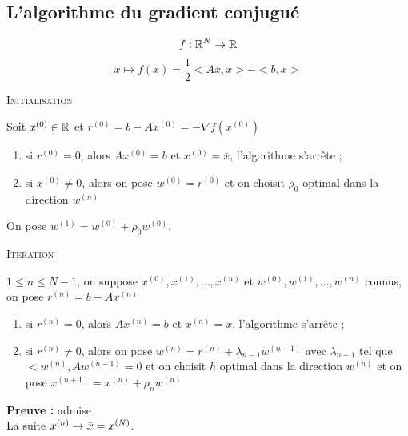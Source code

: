 \subsection{L'algorithme du gradient conjugué}

\[f:\mathbb{R}^N\rightarrow \mathbb{R} \]
\[x \mapsto f(x)=\frac{1}{2}<Ax,x>-<b,x> \]

\textsc{Initialisation}

Soit $x^{(0)} \in \mathbb{R}$ et $r^{(0)}=b-Ax^{(0)}=-\nabla f(x^{(0)})$
\begin{enumerate}
\item si $r^{(0)}=0$, alors $Ax^{(0)}=b$ et $x^{(0)}=\bar{x}$, l'algorithme s'arrête ;
\item si $x^{(0)}\ne0$, alors on pose $w^{(0)}=r^{(0)}$ et on choisit $\rho_0$ optimal dans la direction $w^{(n)}$
\end{enumerate}
On pose $w^{(1)}=w^{(0)}+\rho_0w^{(0)}$.

\textsc{Iteration}

$1\leq n\leq N-1$, on suppose $x^{(0)},x^{(1)},\dots,x^{(n)}$ et $w^{(0)},w^{(1)},\dots,w^{(n)}$ connus, on pose $r^{(n)}=b-Ax^{(n)}$
\begin{enumerate}
\item si $r^{(n)}=0$, alors $Ax^{(n)}=b$ et $x^{(n)}=\bar{x}$, l'algorithme s'arrête ;
\item si $r^{(n)}\ne0$, alors on pose $w^{(n)}=r^{(n)}+\lambda_{n-1}w^{(n-1)}$ avec $\lambda_{n-1}$ tel que $<w^{(n)},Aw^{(n-1)}=0$ et on choisit $h$ optimal dans la direction $w^{(n)}$ et on pose $x^{(n+1)}=x^{(n)}+\rho_nw^{(n)}$
\end{enumerate}

\textbf{Preuve :} admise\\
La suite $x^{(n)} \rightarrow \bar{x}=x^{(N)}$.


